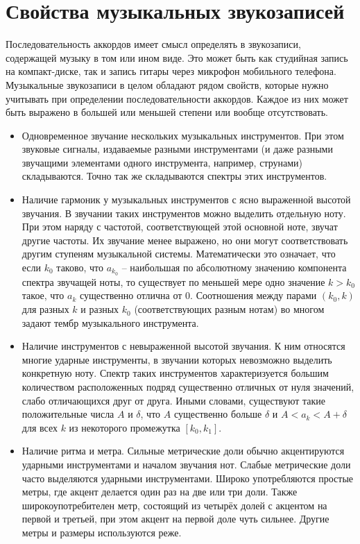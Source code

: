 \section{Свойства музыкальных звукозаписей} \label{sectT_musrec}

Последовательность аккордов имеет смысл определять в звукозаписи, содержащей
музыку в том или ином виде. Это может быть как студийная запись на
компакт-диске, так и запись гитары через микрофон мобильного телефона.
Музыкальные звукозаписи в целом обладают рядом свойств, которые нужно учитывать
при определении последовательности аккордов. Каждое из них может быть выражено
в большей или меньшей степени или вообще отсутствовать.

\begin{itemize}
  \item Одновременное звучание нескольких музыкальных инструментов. При этом
  звуковые сигналы, издаваемые разными инструментами (и даже разными звучащими
  элементами одного инструмента, например, струнами) складываются. Точно так же
  складываются спектры этих инструментов.
  
  \item Наличие гармоник у музыкальных инструментов с ясно выраженной высотой
  звучания. В звучании таких инструментов можно выделить отдельную ноту. При
  этом наряду с частотой, соответствующей этой основной ноте, звучат другие
  частоты. Их звучание менее выражено, но они могут соответствовать другим
  ступеням музыкальной системы. Математически это означает, что если $k_0$
  таково, что $a_{k_0}$ -- наибольшая по абсолютному значению компонента спектра
  звучащей ноты, то существует по меньшей мере одно значение $k > k_0$ такое,
  что $a_k$ существенно отлична от 0. Соотношения между парами $(k_0, k)$ для
  разных $k$ и разных $k_0$ (соответствующих разным нотам) во многом задают
  тембр музыкального инструмента.
  
  \item Наличие инструментов с невыраженной высотой звучания. К ним относятся
  многие ударные инструменты, в звучании которых невозможно выделить конкретную
  ноту. Спектр таких инструментов характеризуется большим количеством
  расположенных подряд существенно отличных от нуля значений, слабо отличающихся
  друг от друга. Иными словами, существуют такие положительные числа $A$ и
  $\delta$, что $A$ существенно больше $\delta$ и $A < a_k < A + \delta$ для
  всех $k$ из некоторого промежутка $[k_0, k_1]$.
  
  \item Наличие ритма и метра. Сильные метрические доли обычно акцентируются
  ударными инструментами и началом звучания нот. Слабые метрические доли часто
  выделяются ударными инструментами. Широко употребляются простые метры, где
  акцент делается один раз на две или три доли. Также широкоупотребителен метр,
  состоящий из четырёх долей с акцентом на первой и третьей, при этом акцент на
  первой доле чуть сильнее. Другие метры и размеры используются реже.
  

\end{itemize}
